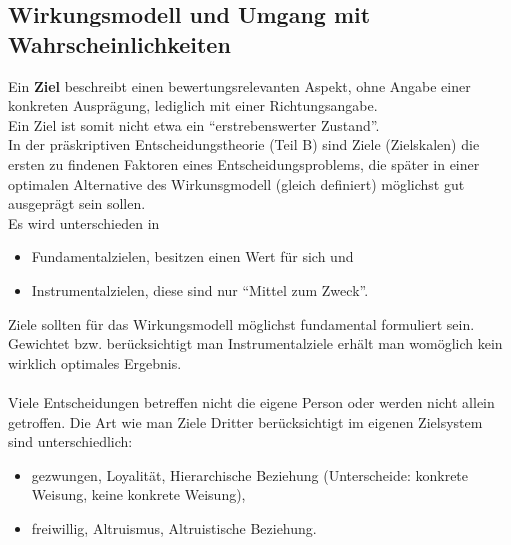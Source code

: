 \subsection{Wirkungsmodell und Umgang mit Wahrscheinlichkeiten}
Ein \textbf{Ziel} beschreibt einen bewertungsrelevanten Aspekt, ohne Angabe einer konkreten Ausprägung, lediglich mit einer Richtungsangabe.\\
Ein Ziel ist somit nicht etwa ein ``erstrebenswerter Zustand''.\\
In der präskriptiven Entscheidungstheorie (Teil B) sind Ziele (Zielskalen) die ersten zu findenen Faktoren eines Entscheidungsproblems, die später in einer optimalen Alternative des Wirkunsgmodell (gleich definiert) möglichst gut ausgeprägt sein sollen.\\
Es wird unterschieden in
\begin{itemize}
	\item Fundamentalzielen, besitzen einen Wert für sich und
	\item Instrumentalzielen, diese sind nur ``Mittel zum Zweck''.
\end{itemize}
Ziele sollten für das Wirkungsmodell möglichst fundamental formuliert sein. Gewichtet bzw. berücksichtigt man Instrumentalziele erhält man womöglich kein wirklich optimales Ergebnis.\\
\ \\
Viele Entscheidungen betreffen nicht die eigene Person oder werden nicht allein getroffen. Die Art wie man Ziele Dritter berücksichtigt im eigenen Zielsystem sind unterschiedlich:
\begin{itemize}
	\item gezwungen, Loyalität, Hierarchische Beziehung (Unterscheide: konkrete Weisung, keine konkrete Weisung),
	\item freiwillig, Altruismus, Altruistische Beziehung.
\end{itemize}

